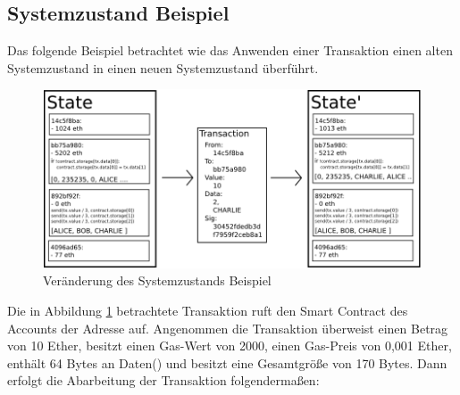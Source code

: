 \subsection{Systemzustand Beispiel}
Das folgende Beispiel betrachtet wie das Anwenden einer Transaktion einen alten Systemzustand in einen neuen Systemzustand überführt. 
\begin{figure}[H]
\centering
\includegraphics[width=1\linewidth]{Figures/eth/ETH_statetransition_example}
\decoRule
\caption{Veränderung des Systemzustands Beispiel \cite{ethereum_white_paper}}
\label{fig:ETH_statetransition_example}
\end{figure}
Die in Abbildung \ref{fig:ETH_statetransition_example} betrachtete Transaktion ruft den Smart Contract des Accounts der Adresse  auf. Angenommen die Transaktion überweist einen Betrag von 10 Ether, besitzt einen Gas-Wert von 2000, einen Gas-Preis von 0,001 Ether, enthält 64 Bytes an Daten() und besitzt eine Gesamtgröße von 170 Bytes. Dann erfolgt die Abarbeitung der Transaktion folgendermaßen:

